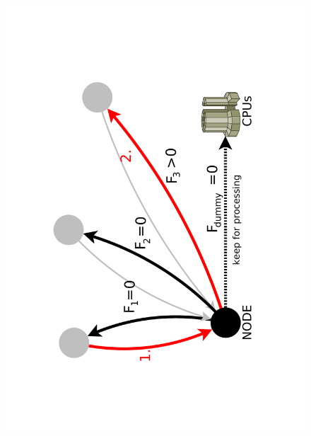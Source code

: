\documentclass{beamer}
\begin{document}
\begin{frame}
\begin{columns}[c]
\begin{figure}[h]
		\includegraphics [trim= 30mm 30mm 30mm 30mm , clip, angle =-90, width=\textwidth]{pic/handler_forwarddia.pdf}
	\label{real_network}
\end{figure} 
\end{columns}

\end{frame}
\end{document}
